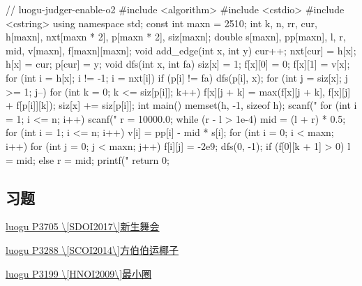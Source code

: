 \begin{cppcode}
// luogu-judger-enable-o2
#include <algorithm>
#include <cstdio>
#include <cstring>
using namespace std;
const int maxn = 2510;
int k, n, rr, cur, h[maxn], nxt[maxn * 2], p[maxn * 2], siz[maxn];
double s[maxn], pp[maxn], l, r, mid, v[maxn], f[maxn][maxn];
void add_edge(int x, int y) {
  cur++;
  nxt[cur] = h[x];
  h[x] = cur;
  p[cur] = y;
}
void dfs(int x, int fa) {
  siz[x] = 1;
  f[x][0] = 0;
  f[x][1] = v[x];
  for (int i = h[x]; i != -1; i = nxt[i])
    if (p[i] != fa) {
      dfs(p[i], x);
      for (int j = siz[x]; j >= 1; j--)
        for (int k = 0; k <= siz[p[i]]; k++)
          f[x][j + k] = max(f[x][j + k], f[x][j] + f[p[i]][k]);
      siz[x] += siz[p[i]];
    }
}
int main() {
  memset(h, -1, sizeof h);
  scanf("%
  for (int i = 1; i <= n; i++)
    scanf("%
  r = 10000.0;
  while (r - l > 1e-4) {
    mid = (l + r) * 0.5;
    for (int i = 1; i <= n; i++) v[i] = pp[i] - mid * s[i];
    for (int i = 0; i < maxn; i++)
      for (int j = 0; j < maxn; j++) f[i][j] = -2e9;
    dfs(0, -1);
    if (f[0][k + 1] > 0)
      l = mid;
    else
      r = mid;
  }
  printf("%
  return 0;
}
\end{cppcode}

\subsection{习题}

\href{https://www.luogu.org/problemnew/show/P3705}{ luogu P3705 \textbackslash{}[SDOI2017\textbackslash{}]新生舞会 }

\href{https://www.luogu.org/problemnew/show/P3288}{ luogu P3288 \textbackslash{}[SCOI2014\textbackslash{}]方伯伯运椰子 }

\href{https://www.luogu.org/problemnew/show/P3199}{ luogu P3199 \textbackslash{}[HNOI2009\textbackslash{}]最小圈 }
